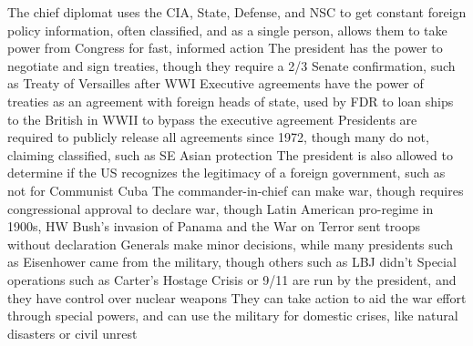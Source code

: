 \documentclass[11 pt, twoside]{article}
\newenvironment{outline*}
{
	\begin{outline}[enumerate]
	}
	{\end{outline}
}
\begin{document}
\begin{outline*}
\1 The chief diplomat uses the CIA, State, Defense, and NSC to get constant foreign policy information, often classified, and as a single person, allows them to take power from Congress for fast, informed action
\2 The president has the power to negotiate and sign treaties, though they require a 2/3 Senate confirmation, such as Treaty of Versailles after WWI
\2 Executive agreements have the power of treaties as an agreement with foreign heads of state, used by FDR to loan ships to the British in WWII to bypass the executive agreement
\2 Presidents are required to publicly release all agreements since 1972, though many do not, claiming classified, such as SE Asian protection
\2 The president is also allowed to determine if the US recognizes the legitimacy of a foreign government, such as not for Communist Cuba
\1 The commander-in-chief can make war, though requires congressional approval to declare war, though Latin American pro-regime in 1900s, HW Bush’s invasion of Panama and the War on Terror sent troops without declaration
\2 Generals make minor decisions, while many presidents such as Eisenhower came from the military, though others such as LBJ didn’t
\2 Special operations such as Carter’s Hostage Crisis or 9/11 are run by the president, and they have control over nuclear weapons
\2 They can take action to aid the war effort through special powers, and can use the military for domestic crises, like natural disasters or civil unrest
\end{outline*}
\end{document}

